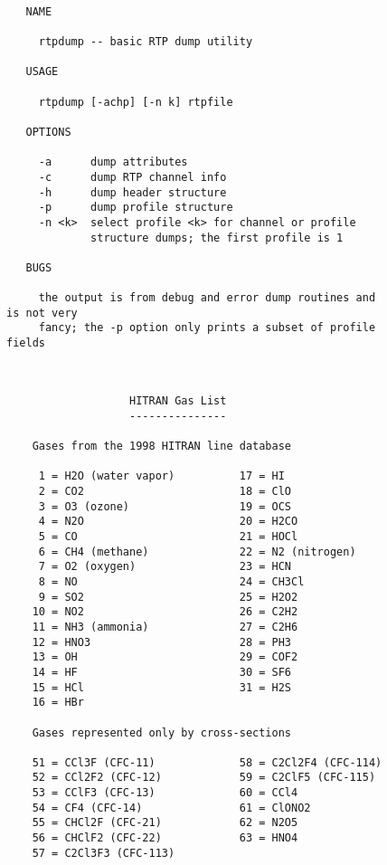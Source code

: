 \documentclass[12pt]{article}
\begin{document}
\begin{figure}
{\small
\begin{verbatim}

   NAME

     rtpdump -- basic RTP dump utility
  
   USAGE
  
     rtpdump [-achp] [-n k] rtpfile
  
   OPTIONS
  
     -a      dump attributes
     -c      dump RTP channel info
     -h      dump header structure
     -p      dump profile structure
     -n <k>  select profile <k> for channel or profile 
             structure dumps; the first profile is 1
  
   BUGS

     the output is from debug and error dump routines and is not very
     fancy; the -p option only prints a subset of profile fields
 
\end{verbatim}
}
\end{figure}
\begin{figure}
{\small
\begin{verbatim}

                   HITRAN Gas List
                   ---------------
                                    
    Gases from the 1998 HITRAN line database
    
     1 = H2O (water vapor)          17 = HI
     2 = CO2                        18 = ClO
     3 = O3 (ozone)                 19 = OCS
     4 = N2O                        20 = H2CO
     5 = CO                         21 = HOCl
     6 = CH4 (methane)              22 = N2 (nitrogen)
     7 = O2 (oxygen)                23 = HCN
     8 = NO                         24 = CH3Cl
     9 = SO2                        25 = H2O2
    10 = NO2                        26 = C2H2
    11 = NH3 (ammonia)              27 = C2H6
    12 = HNO3                       28 = PH3
    13 = OH                         29 = COF2
    14 = HF                         30 = SF6
    15 = HCl                        31 = H2S
    16 = HBr
    
    Gases represented only by cross-sections
    
    51 = CCl3F (CFC-11)             58 = C2Cl2F4 (CFC-114)
    52 = CCl2F2 (CFC-12)            59 = C2ClF5 (CFC-115)
    53 = CClF3 (CFC-13)             60 = CCl4
    54 = CF4 (CFC-14)               61 = ClONO2
    55 = CHCl2F (CFC-21)            62 = N2O5
    56 = CHClF2 (CFC-22)            63 = HNO4
    57 = C2Cl3F3 (CFC-113)

  
\end{verbatim}
}
\end{figure}
\end{document}
